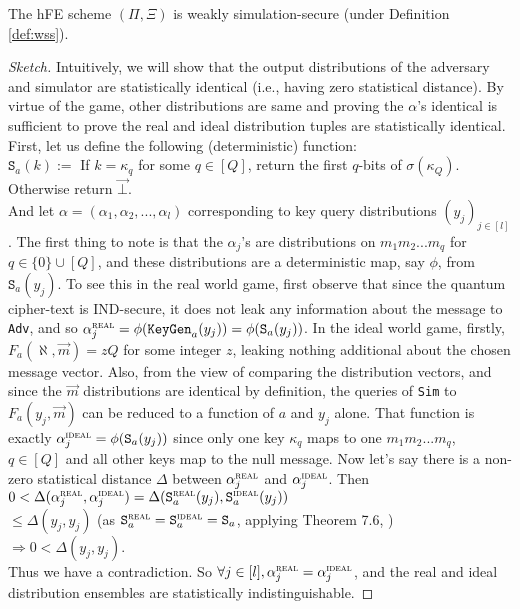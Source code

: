 \begin{theorem}
\label{thm:pixi-weaksim}
The hFE scheme $(\Pi,\Xi)$ is weakly simulation-secure (under Definition \ref{def:wss}).
\end{theorem}
\begin{proof}[Sketch]
Intuitively, we will show that the output distributions of the adversary and simulator are statistically identical (i.e., having zero statistical distance). By virtue of the game, other distributions are same and proving the $\alpha$'s identical is sufficient to prove the real and ideal distribution tuples are statistically identical. \\
First, let us define the following (deterministic) function: \\
$\texttt{S}_a(k) := $ If $k = \kappa_q$ for some $q \in [Q]$, return the first $q$-bits of $\sigma(\kappa_Q)$. Otherwise return $\vec \bot$. \\
And let $\alpha = (\alpha_1,\alpha_2,...,\alpha_l)$ corresponding to key query distributions $( y_j )_{j \in [l]}$. The first thing to note is that the $\alpha_j$'s are distributions on $m_1m_2...m_q$ for $q \in \{ 0 \} \cup [Q]$, and these distributions are a deterministic map, say $\phi$, from $\texttt{S}_a(y_j)$. To see this in the real world game, first observe that since the quantum cipher-text is IND-secure, it does not leak any information about the message to \texttt{Adv}, and so $\alpha^{\textsc{real}}_j = \phi(\texttt{KeyGen}_a(y_j)) =  \phi(\texttt{S}_a(y_j))$. In the ideal world game, firstly, $F_a(\aleph, \vec m) = zQ$ for some integer $z$, leaking nothing additional about the chosen message vector. Also, from the view of comparing the distribution vectors, and since the $\vec m$ distributions are identical by definition, the queries of \texttt{Sim} to $F_a(y_j,\vec m)$ can be reduced to a function of $a$ and $y_j$ alone. That function is exactly $\alpha^{\textsc{ideal}}_j = \phi(\texttt{S}_a(y_j))$ since only one key $\kappa_q$ maps to one $m_1m_2...m_q$, $q \in [Q]$ and all other keys map to the null message. Now let's say there is a non-zero statistical distance $\Delta$ between $\alpha^{\textsc{real}}_j$ and $\alpha^{\textsc{ideal}}_j$. Then 
$0 < \Delta(\alpha^{\textsc{real}}_j,\alpha^{\textsc{ideal}}_j) = \Delta(\texttt{S}^{\textsc{real}}_a(y_j),\texttt{S}^{\textsc{ideal}}_a(y_j)) $ \\
$ \le \Delta(y_j, y_j)$ (as $\texttt{S}^{\textsc{real}}_a = \texttt{S}^{\textsc{ideal}}_a = \texttt{S}_a$, applying Theorem 7.6, \cite{statdist}) \\
$\Rightarrow 0 < \Delta(y_j, y_j)$. \\
Thus we have a contradiction. So $\forall j \in [l], \alpha^{\textsc{real}}_j = \alpha^{\textsc{ideal}}_j$, and the real and ideal distribution ensembles are statistically indistinguishable.
\end{proof}

